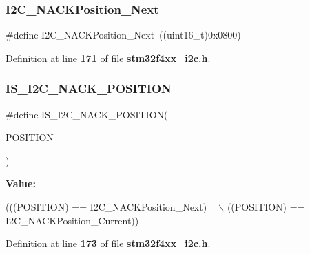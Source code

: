 \subsubsection{I2\+C\+\_\+\+N\+A\+C\+K\+Position\+\_\+\+Next}
{\footnotesize\ttfamily \#define I2\+C\+\_\+\+N\+A\+C\+K\+Position\+\_\+\+Next~((uint16\+\_\+t)0x0800)}



Definition at line \textbf{ 171} of file \textbf{ stm32f4xx\+\_\+i2c.\+h}.

\mbox{\label{group__I2C__NACK__position_ga631b4b1674a12aa2b3b27360983029e3}} 
\subsubsection{I\+S\+\_\+\+I2\+C\+\_\+\+N\+A\+C\+K\+\_\+\+P\+O\+S\+I\+T\+I\+ON}
{\footnotesize\ttfamily \#define I\+S\+\_\+\+I2\+C\+\_\+\+N\+A\+C\+K\+\_\+\+P\+O\+S\+I\+T\+I\+ON(\begin{DoxyParamCaption}\item[{}]{P\+O\+S\+I\+T\+I\+ON }\end{DoxyParamCaption})}

{\bfseries Value\+:}
\begin{DoxyCode}
(((POSITION) == I2C_NACKPosition_Next) || \(\backslash\)
                                         ((POSITION) == I2C_NACKPosition_Current))
\end{DoxyCode}


Definition at line \textbf{ 173} of file \textbf{ stm32f4xx\+\_\+i2c.\+h}.

